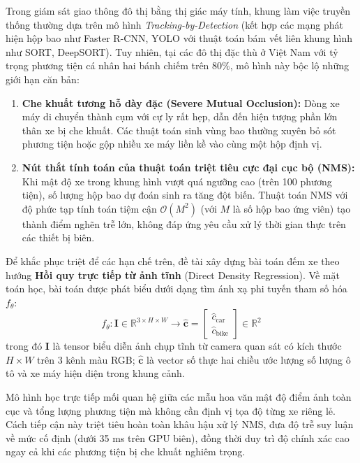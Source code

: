 Trong giám sát giao thông đô thị bằng thị giác máy tính, khung làm việc truyền thống thường dựa trên mô hình \textit{Tracking-by-Detection} (kết hợp các mạng phát hiện hộp bao như Faster R-CNN, YOLO với thuật toán bám vết liên khung hình như SORT, DeepSORT). Tuy nhiên, tại các đô thị đặc thù ở Việt Nam với tỷ trọng phương tiện cá nhân hai bánh chiếm trên $80\%$, mô hình này bộc lộ những giới hạn căn bản:
\begin{enumerate}
    \item \textbf{Che khuất tương hỗ dày đặc (Severe Mutual Occlusion):} Dòng xe máy di chuyển thành cụm với cự ly rất hẹp, dẫn đến hiện tượng phần lớn thân xe bị che khuất. Các thuật toán sinh vùng bao thường xuyên bỏ sót phương tiện hoặc gộp nhiều xe máy liền kề vào cùng một hộp định vị.
    \item \textbf{Nút thắt tính toán của thuật toán triệt tiêu cực đại cục bộ (NMS):} Khi mật độ xe trong khung hình vượt quá ngưỡng cao (trên 100 phương tiện), số lượng hộp bao dự đoán sinh ra tăng đột biến. Thuật toán NMS với độ phức tạp tính toán tiệm cận $\mathcal{O}(M^2)$ (với $M$ là số hộp bao ứng viên) tạo thành điểm nghẽn trễ lớn, không đáp ứng yêu cầu xử lý thời gian thực trên các thiết bị biên.
\end{enumerate}

Để khắc phục triệt để các hạn chế trên, đề tài xây dựng bài toán đếm xe theo hướng \textbf{Hồi quy trực tiếp từ ảnh tĩnh} (Direct Density Regression). Về mặt toán học, bài toán được phát biểu dưới dạng tìm ánh xạ phi tuyến tham số hóa $f_\theta$:
\begin{equation}
    f_\theta: \mathbf{I} \in \mathbb{R}^{3 \times H \times W} \longrightarrow \hat{\mathbf{c}} = \begin{bmatrix} \hat{c}_{\text{car}} \\ \hat{c}_{\text{bike}} \end{bmatrix} \in \mathbb{R}^2
\end{equation}
trong đó $\mathbf{I}$ là tensor biểu diễn ảnh chụp tĩnh từ camera quan sát có kích thước $H \times W$ trên 3 kênh màu RGB; $\hat{\mathbf{c}}$ là vector số thực hai chiều ước lượng số lượng ô tô và xe máy hiện diện trong khung cảnh.

Mô hình học trực tiếp mối quan hệ giữa các mẫu hoa văn mật độ điểm ảnh toàn cục và tổng lượng phương tiện mà không cần định vị tọa độ từng xe riêng lẻ. Cách tiếp cận này triệt tiêu hoàn toàn khâu hậu xử lý NMS, đưa độ trễ suy luận về mức cố định (dưới 35 ms trên GPU biên), đồng thời duy trì độ chính xác cao ngay cả khi các phương tiện bị che khuất nghiêm trọng.

